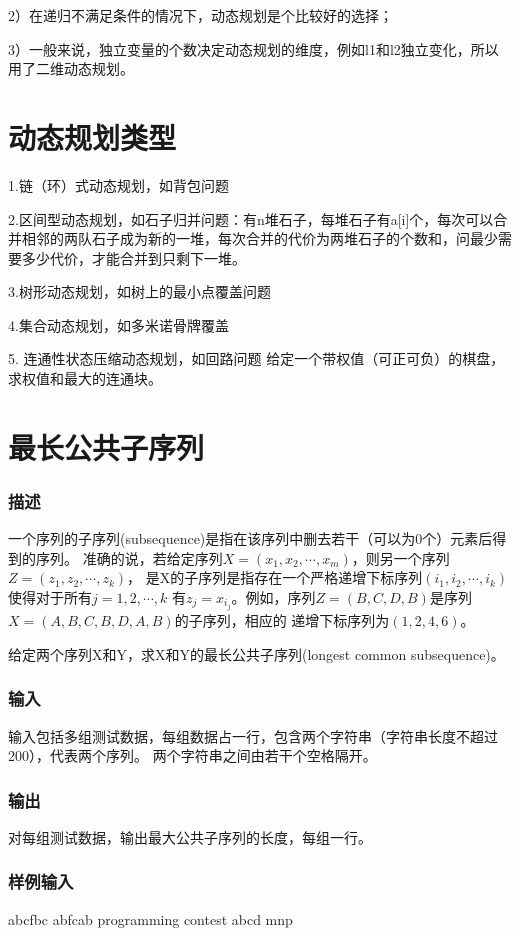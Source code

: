 2）在递归不满足条件的情况下，动态规划是个比较好的选择；

3）一般来说，独立变量的个数决定动态规划的维度，例如l1和l2独立变化，所以用了二维动态规划。


\section{动态规划类型}
1.链（环）式动态规划，如背包问题

2.区间型动态规划，如石子归并问题：有n堆石子，每堆石子有a[i]个，每次可以合并相邻的两队石子成为新的一堆，每次合并的代价为两堆石子的个数和，问最少需要多少代价，才能合并到只剩下一堆。

3.树形动态规划，如树上的最小点覆盖问题

4.集合动态规划，如多米诺骨牌覆盖

5. 连通性状态压缩动态规划，如回路问题
给定一个带权值（可正可负）的棋盘，求权值和最大的连通块。

\section{最长公共子序列} %
\subsubsection{描述}
一个序列的子序列(subsequence)是指在该序列中删去若干（可以为0个）元素后得到的序列。
准确的说，若给定序列$X=(x_1,x_2,\cdots,x_m)$，则另一个序列$Z=(z_1,z_2,\cdots,z_k)$，
是X的子序列是指存在一个严格递增下标序列$(i_1,i_2,\cdots,i_k)$使得对于所有$j=1,2,\cdots,k$
有$z_j=x_{i_j}$。例如，序列$Z=(B,C,D,B)$是序列$X=(A,B,C,B,D,A,B)$的子序列，相应的
递增下标序列为$(1,2,4,6)$。

给定两个序列X和Y，求X和Y的最长公共子序列(longest common subsequence)。

\subsubsection{输入}
输入包括多组测试数据，每组数据占一行，包含两个字符串（字符串长度不超过200），代表两个序列。
两个字符串之间由若干个空格隔开。

\subsubsection{输出}
对每组测试数据，输出最大公共子序列的长度，每组一行。

\subsubsection{样例输入}
\begin{Code}
abcfbc abfcab
programming contest 
abcd mnp
\end{Code}


